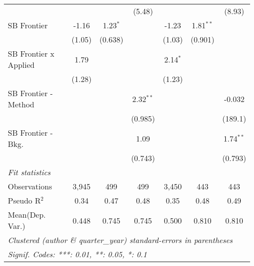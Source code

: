 \begin{tabular}{lcccccc}
                                  &                &               & (5.48)        &                &               & (8.93)\\   
   SB Frontier                    & -1.16          & 1.23$^{*}$    &               & -1.23          & 1.81$^{**}$   &   \\   
                                  & (1.05)         & (0.638)       &               & (1.03)         & (0.901)       &   \\   
   SB Frontier x Applied          & 1.79           &               &               & 2.14$^{*}$     &               &   \\   
                                  & (1.28)         &               &               & (1.23)         &               &   \\   
   SB Frontier - Method           &                &               & 2.32$^{**}$   &                &               & -0.032\\   
                                  &                &               & (0.985)       &                &               & (189.1)\\   
   SB Frontier - Bkg.             &                &               & 1.09          &                &               & 1.74$^{**}$\\   
                                  &                &               & (0.743)       &                &               & (0.793)\\   
   \midrule
   \emph{Fit statistics}\\
   Observations                   & 3,945          & 499           & 499           & 3,450          & 443           & 443\\  
   Pseudo R$^2$                   & 0.34           & 0.47          & 0.48          & 0.35           & 0.48          & 0.49\\  
Mean(Dep. Var.) & 0.448 & 0.745 & 0.745 & 0.500 & 0.810 & 0.810 \\
   \midrule \midrule
   \multicolumn{7}{l}{\emph{Clustered (author \& quarter\_year) standard-errors in parentheses}}\\
   \multicolumn{7}{l}{\emph{Signif. Codes: ***: 0.01, **: 0.05, *: 0.1}}\\
\end{tabular}
\par\endgroup
